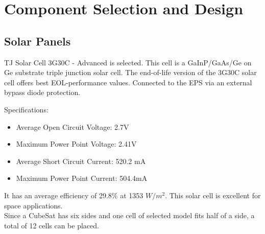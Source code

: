 \chapter{Component Selection and Design}
\justifying
\section[Solar Panels]{Solar Panels}
 TJ Solar Cell 3G30C - Advanced is selected. This cell is a GaInP/GaAs/Ge on Ge substrate triple junction solar cell. The end-of-life version of the 3G30C solar cell offers best EOL-performance
 values. Connected to the EPS via an external bypass diode protection.
 
 Specifications:
 \begin{itemize}
 	\item Average Open Circuit Voltage: 2.7V
 	\item Maximum Power Point Voltage: 2.41V
 	\item Average Short Circuit Current: 520.2 mA
 	\item Maximum Power Point Current: 504.4mA
 \end{itemize}
It has an average efficiency of 29.8\% at 1353 $W/m^{2}$. This solar cell is excellent for space applications. 
\\

Since a CubeSat has six sides and one cell of selected model fits half of a side, a total of 12 cells can be placed.\\ 

